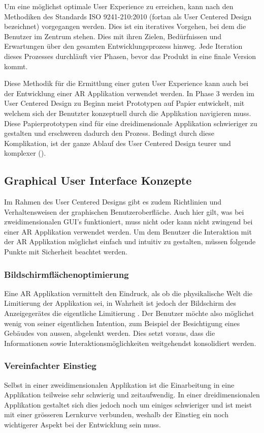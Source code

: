 \documentclass[a4paper]{scrreprt}
\begin{document}
Um eine möglichst optimale User Experience zu erreichen, kann nach den Methodiken des Standards ISO 9241-210:2010 (fortan als User Centered Design bezeichnet) vorgegangen werden. Dies ist ein iteratives Vorgehen, bei dem die Benutzer im Zentrum stehen. Dies mit ihren Zielen, Bedürfnissen und Erwartungen über den gesamten Entwicklungsprozess hinweg. 
Jede Iteration dieses Prozesses durchläuft vier Phasen, bevor das Produkt in eine finale Version kommt.

Diese Methodik für die Ermittlung einer guten User Experience kann auch bei der Entwicklung einer AR Applikation verwendet werden.
In Phase 3 werden im User Centered Design zu Beginn meist Prototypen auf Papier entwickelt, mit welchem sich der Benutzter konzeptuell durch die Applikation navigieren muss. Diese Papierprototypen sind für eine dreidimensionale Applikation schwieriger zu gestalten und erschweren dadurch den Prozess. Bedingt durch diese Komplikation, ist der ganze Ablauf des User Centered Design teurer und komplexer (\cite{ISO9241}).

\subsection{Graphical User Interface Konzepte}
Im Rahmen des User Centered Designs gibt es zudem Richtlinien und Verhaltensweisen der graphischen Benutzeroberfläche.
Auch hier gilt, was bei zweidimensionalen GUI's funktioniert, muss nicht oder kann nicht zwingend bei einer AR Applikation verwendet werden. Um dem Benutzer die Interaktion mit der AR Applikation möglichst einfach und intuitiv zu gestalten, müssen folgende Punkte mit Sicherheit beachtet werden.

\subsubsection{Bildschirmflächenoptimierung}
Eine AR Applikation vermittelt den Eindruck, als ob die physikalische Welt die Limitierung der Applikation sei, in Wahrheit ist jedoch der Bildschirm des Anzeigegerätes die eigentliche Limitierung .
Der Benutzer möchte also möglichst wenig von seiner eigentlichen Intention, zum Beispiel der Besichtigung eines Gebäudes von aussen, abgelenkt werden. Dies setzt voraus, dass die Informationen sowie Interaktionsmöglichkeiten weitgehendst konsolidiert werden.

\subsubsection{Vereinfachter Einstieg}
Selbst in einer zweidimensionalen Applikation ist die Einarbeitung in eine Applikation teilweise sehr schwierig und zeitaufwendig. In einer dreidimensionalen Applikation gestaltet sich dies jedoch noch um einiges schwieriger und ist meist mit einer grösseren Lernkurve verbunden, weshalb der Einstieg ein noch wichtigerer Aspekt bei der Entwicklung sein muss.
\end{document}
